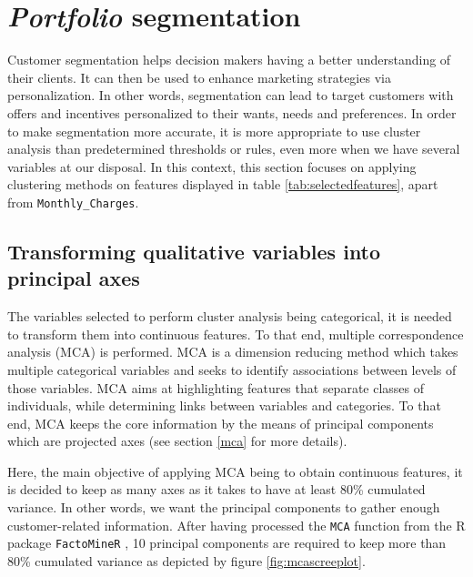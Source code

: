\documentclass[
]{book}
\begin{document}
\hypertarget{segmentation}{%
\section{\texorpdfstring{\emph{Portfolio} segmentation}{Portfolio segmentation}}\label{segmentation}}

Customer segmentation helps decision makers having a better understanding of their clients. It can then be used to enhance marketing strategies via personalization. In other words, segmentation can lead to target customers with offers and incentives personalized to their wants, needs and preferences. In order to make segmentation more accurate, it is more appropriate to use cluster analysis than predetermined thresholds or rules, even more when we have several variables at our disposal. In this context, this section focuses on applying clustering methods on features displayed in table \ref{tab:selectedfeatures}, apart from \texttt{Monthly\_Charges}.

\hypertarget{transforming-qualitative-variables-into-principal-axes}{%
\subsection{Transforming qualitative variables into principal axes}\label{transforming-qualitative-variables-into-principal-axes}}

The variables selected to perform cluster analysis being categorical, it is needed to transform them into continuous features. To that end, multiple correspondence analysis (MCA) is performed. MCA is a dimension reducing method which takes multiple categorical variables and seeks to identify associations between levels of those variables. MCA aims at highlighting features that separate classes of individuals, while determining links between variables and categories. To that end, MCA keeps the core information by the means of principal components which are projected axes (see section \ref{mca} for more details).

Here, the main objective of applying MCA being to obtain continuous features, it is decided to keep as many axes as it takes to have at least 80\% cumulated variance. In other words, we want the principal components to gather enough customer-related information. After having processed the \texttt{MCA} function from the R package \texttt{FactoMineR} \citep{FactoMineR2008}, 10 principal components are required to keep more than 80\% cumulated variance as depicted by figure \ref{fig:mcascreeplot}.
\end{document}
